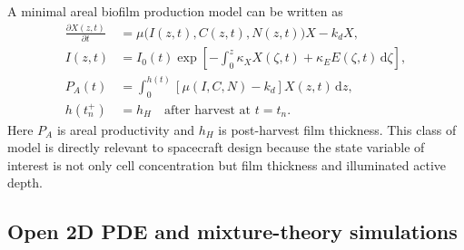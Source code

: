 \documentclass[11pt]{article}
\newcommand{\dd}{\mathrm{d}}
\begin{document}
A minimal areal biofilm production model can be written as
\begin{align}
  \frac{\partial X(z,t)}{\partial t}
  &=\mu\big(I(z,t),C(z,t),N(z,t)\big)X-k_dX,\label{eq:areal_biofilm_growth}\\
  I(z,t)&=I_0(t)\exp\left[-\int_0^z \kappa_X X(\zeta,t)+\kappa_EE(\zeta,t)\,\dd\zeta\right],\label{eq:biofilm_light}\\
  P_A(t)&=\int_0^{h(t)}\left[\mu(I,C,N)-k_d\right]X(z,t)\,\dd z,\label{eq:areal_productivity}\\
  h(t_n^+)&=h_H\quad \text{after harvest at }t=t_n.\label{eq:harvest_reset}
\end{align}
Here $P_A$ is areal productivity and $h_H$ is post-harvest film thickness. This class of model is directly relevant to spacecraft design because the state variable of interest is not only cell concentration but film thickness and illuminated active depth.

\subsection{Open 2D PDE and mixture-theory simulations}
\end{document}

